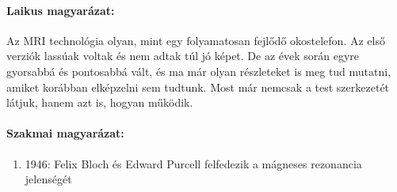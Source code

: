 \documentclass[a4paper,12pt]{article}
\begin{document}
\paragraph{Laikus magyarázat:} Az MRI technológia olyan, mint egy folyamatosan fejlődő okostelefon. Az első verziók lassúak voltak és nem adtak túl jó képet. De az évek során egyre gyorsabbá és pontosabbá vált, és ma már olyan részleteket is meg tud mutatni, amiket korábban elképzelni sem tudtunk. Most már nemcsak a test szerkezetét látjuk, hanem azt is, hogyan működik.

\paragraph{Szakmai magyarázat:} \begin{enumerate} \item 1946: Felix Bloch és Edward Purcell felfedezik a mágneses rezonancia jelenségét


\end{enumerate}
\end{document}
